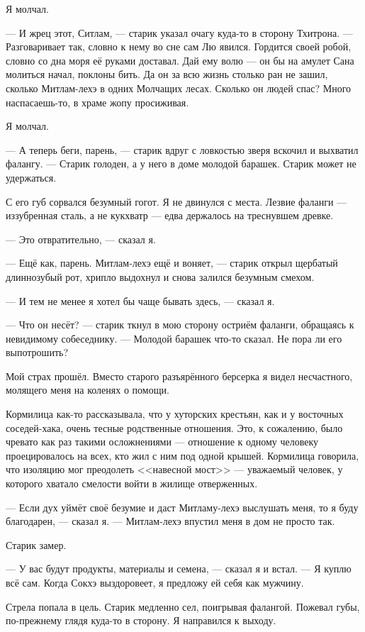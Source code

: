 Я молчал.

--- И жрец этот, Ситлам, --- старик указал очагу куда-то в сторону Тхитрона.
--- Разговаривает так, словно к нему во сне сам Лю явился.
Гордится своей робой, словно со дна моря её руками доставал.
Дай ему волю --- он бы на амулет Сана молиться начал, поклоны бить.
Да он за всю жизнь столько ран не зашил, сколько Митлам-лехэ в одних Молчащих лесах.
Сколько он людей спас?
Много наспасаешь-то, в храме жопу просиживая.

Я молчал.

--- А теперь беги, парень, --- старик вдруг с ловкостью зверя вскочил и выхватил фалангу.
--- Старик голоден, а у него в доме молодой барашек.
Старик может не удержаться.

С его губ сорвался безумный гогот.
Я не двинулся с места.
Лезвие фаланги --- иззубренная сталь, а не кукхватр --- едва держалось на треснувшем древке.

--- Это отвратительно, --- сказал я.

--- Ещё как, парень.
Митлам-лехэ ещё и воняет, --- старик открыл щербатый длиннозубый рот, хрипло выдохнул и снова залился безумным смехом.

--- И тем не менее я хотел бы чаще бывать здесь, --- сказал я.

--- Что он несёт? --- старик ткнул в мою сторону остриём фаланги, обращаясь к невидимому собеседнику.
--- Молодой барашек что-то сказал.
Не пора ли его выпотрошить?

Мой страх прошёл.
Вместо старого разъярённого берсерка я видел несчастного, молящего меня на коленях о помощи.

Кормилица как-то рассказывала, что у хуторских крестьян, как и у восточных соседей-хака, очень тесные родственные отношения.
Это, к сожалению, было чревато как раз такими осложнениями --- отношение к одному человеку проецировалось на всех, кто жил с ним под одной крышей.
Кормилица говорила, что изоляцию мог преодолеть <<навесной мост>> --- уважаемый человек, у которого хватало смелости войти в жилище отверженных.

--- Если дух уймёт своё безумие и даст Митламу-лехэ выслушать меня, то я буду благодарен, --- сказал я.
--- Митлам-лехэ впустил меня в дом не просто так.

Старик замер.

--- У вас будут продукты, материалы и семена, --- сказал я и встал.
--- Я куплю всё сам.
Когда Сокхэ выздоровеет, я предложу ей себя как мужчину.

Стрела попала в цель.
Старик медленно сел, поигрывая фалангой.
Пожевал губы, по-прежнему глядя куда-то в сторону.
Я направился к выходу.

